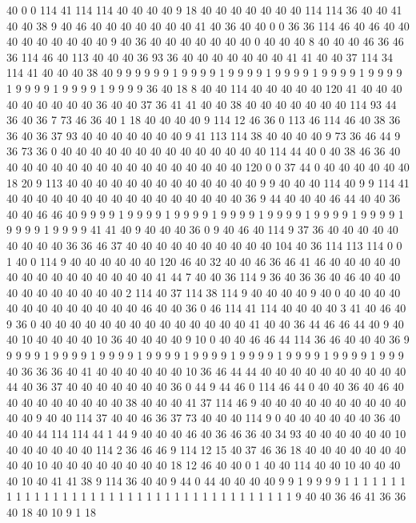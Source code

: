 40 0 0 114 41 114 114 40 40 40 40 9 18 40 40 40 40 40 40 40
114 114 36 40 40 41 40 40 38 9 40 46 40 40 40 40 40 40 40 41
40 36 40 40 0 0 36 36 114 46 40 46 40 40 40 40 40 40 40 40
40 9 40 36 40 40 40 40 40 40 40 0 40 40 40 8 40 40 40 46
36 46 36 114 46 40 113 40 40 40 36 93 36 40 40 40 40 40 40 40
41 41 40 40 37 114 34 114 41 40 40 40 38 40 9 9 9 9 9 9
1 9 9 9 9 1 9 9 9 9 1 9 9 9 9 1 9 9 9 9
1 9 9 9 9 1 9 9 9 9 1 9 9 9 9 1 9 9 9 9
36 40 18 8 40 40 114 40 40 40 40 40 120 41 40 40 40 40 40 40
40 40 40 36 40 40 37 36 41 41 40 40 38 40 40 40 40 40 40 40
114 93 44 36 40 36 7 73 46 36 40 1 18 40 40 40 40 9 114 12
46 36 0 113 46 114 46 40 38 36 36 40 36 37 93 40 40 40 40 40
40 40 9 41 113 114 38 40 40 40 40 9 73 36 46 44 9 36 73 36
0 40 40 40 40 40 40 40 40 40 40 40 40 40 40 114 44 40 0 40
38 46 36 40 40 40 40 40 40 40 40 40 40 40 40 40 40 40 40 40
120 0 0 37 44 0 40 40 40 40 40 40 18 20 9 113 40 40 40 40
40 40 40 40 40 40 40 40 40 9 9 40 40 40 114 40 9 9 114 41
40 40 40 40 40 40 40 40 40 40 40 40 40 40 40 40 36 9 44 40
40 40 46 44 40 40 36 40 40 46 46 40 9 9 9 9 1 9 9 9
9 1 9 9 9 9 1 9 9 9 9 1 9 9 9 9 1 9 9 9
9 1 9 9 9 9 1 9 9 9 9 1 9 9 9 9 41 41 40 9
40 40 40 36 0 9 40 46 40 114 9 37 36 40 40 40 40 40 40 40
40 40 36 36 46 37 40 40 40 40 40 40 40 40 40 40 104 40 36 114
113 114 0 0 1 40 0 114 9 40 40 40 40 40 40 120 46 40 32 40
40 46 36 46 41 46 40 40 40 40 40 40 40 40 40 40 40 40 40 40
40 41 44 7 40 40 36 114 9 36 40 36 36 40 46 40 40 40 40 40
40 40 40 40 40 40 2 114 40 37 114 38 114 9 40 40 40 40 9 40
0 40 40 40 40 40 40 40 40 40 40 40 40 40 46 40 40 36 0 46
114 41 114 40 40 40 40 3 41 40 46 40 9 36 0 40 40 40 40 40
40 40 40 40 40 40 40 40 40 41 40 40 36 44 46 46 44 40 9 40
40 10 40 40 40 40 10 36 40 40 40 40 9 10 0 40 40 46 46 44
114 36 46 40 40 40 36 9 9 9 9 9 1 9 9 9 9 1 9 9
9 9 1 9 9 9 9 1 9 9 9 9 1 9 9 9 9 1 9 9
9 9 1 9 9 9 9 1 9 9 9 40 36 36 36 40 41 40 40 40
40 40 40 10 36 46 44 44 40 40 40 40 40 40 40 40 40 40 44 40
36 37 40 40 40 40 40 40 40 36 0 44 9 44 46 0 114 46 44 0
40 40 36 40 46 40 40 40 40 40 40 40 40 40 38 40 40 40 41 37
114 46 9 40 40 40 40 40 40 40 40 40 40 40 40 9 40 40 114 37
40 40 46 36 37 73 40 40 40 114 9 0 40 40 40 40 40 40 36 40
40 40 44 114 114 44 1 44 9 40 40 40 46 40 36 46 36 40 34 93
40 40 40 40 40 40 10 40 40 40 40 40 40 114 2 36 46 46 9 114
12 15 40 37 46 36 18 40 40 40 40 40 40 40 40 40 10 40 40 40
40 40 40 40 40 18 12 46 40 40 0 1 40 40 114 40 40 10 40 40
40 40 10 40 41 41 38 9 114 36 40 40 9 44 0 44 40 40 40 40
9 9 1 9 9 9 9 1 1 1 1 1 1 1 1 1 1 1 1 1
1 1 1 1 1 1 1 1 1 1 1 1 1 1 1 1 1 1 1 1
1 1 1 1 1 9 40 40 36 46 41 36 36 40 18 40 10 9 1 18
